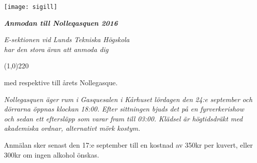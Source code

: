\documentclass[11pt]{article}
\def\date{2016}
\def\doctitle{Anmodan till Nolleqasquen \date}
\begin{document}
    \begin{center}
        \texttt{[image: sigill]}
        \par
        \vspace*{6mm}

        \textit{\textbf{\Large \doctitle}}

        {\it
            E-sektionen vid Lunds Tekniska Högskola\\
            har den stora äran att anmoda dig
            \par \vspace*{8mm} \line(1,0){220} \par \vspace*{-1mm}
            med respektive till årets Nollegasque.
        }
    \end{center}

    \vspace*{\baselineskip}

    {\it
    Nollegasquen äger rum i Gasquesalen i Kårhuset lördagen den 24:e september och dörrarna öppnas klockan 18:00. Efter sittningen bjuds det på en fyrverkerishow och sedan ett eftersläpp som varar fram till 03:00. Klädsel är högtidsdräkt med akademiska ordnar, alternativt mörk kostym.

    Anmälan sker senast den 17:e september till en kostnad av 350kr per kuvert, eller 300kr om ingen alkohol önskas.
    }
\end{document}
